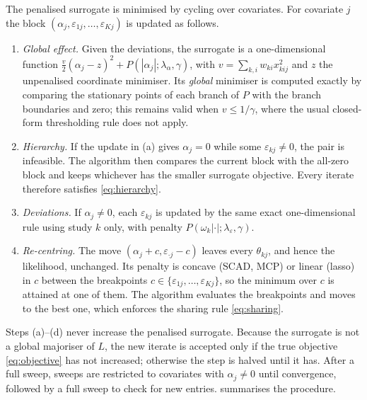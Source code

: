 \documentclass[11pt]{article}
\theoremstyle{remark}
\numberwithin{equation}{section}
\begin{document}
The penalised surrogate is minimised by cycling over covariates. For covariate
$j$ the block $(\alpha_j,\varepsilon_{1j},\dots,\varepsilon_{Kj})$ is updated as
follows.
\begin{enumerate}[label=(\alph*), leftmargin=1.4em]
  \item \emph{Global effect.} Given the deviations, the surrogate is a
    one-dimensional function $\tfrac{v}{2}(\alpha_j-z)^2+P(|\alpha_j|;\lambda_\alpha,\gamma)$,
    with $v=\sum_{k,i}w_{ki}x_{kij}^2$ and $z$ the unpenalised coordinate
    minimiser. Its \emph{global} minimiser is computed exactly by comparing the
    stationary points of each branch of $P$ with the branch boundaries and zero;
    this remains valid when $v\le1/\gamma$, where the usual closed-form
    thresholding rule does not apply.
  \item \emph{Hierarchy.} If the update in (a) gives $\alpha_j=0$ while some
    $\varepsilon_{kj}\ne0$, the pair is infeasible. The algorithm then compares the
    current block with the all-zero block and keeps whichever has the smaller
    surrogate objective. Every iterate therefore satisfies \eqref{eq:hierarchy}.
  \item \emph{Deviations.} If $\alpha_j\neq0$, each $\varepsilon_{kj}$ is updated
    by the same exact one-dimensional rule using study $k$ only, with penalty
    $P(\omega_k|\cdot|;\lambda_\varepsilon,\gamma)$.
  \item \emph{Re-centring.} The move $(\alpha_j+c,\varepsilon_{\cdot j}-c)$ leaves every
    $\theta_{kj}$, and hence the likelihood, unchanged. Its penalty is concave
    (SCAD, MCP) or linear (lasso) in $c$ between the breakpoints
    $c\in\{\varepsilon_{1j},\dots,\varepsilon_{Kj}\}$, so the minimum over $c$ is
    attained at one of them. The algorithm evaluates the breakpoints and moves to
    the best one, which enforces the sharing rule \eqref{eq:sharing}.
\end{enumerate}
Steps (a)--(d) never increase the penalised surrogate. Because the surrogate is
not a global majoriser of $L$, the new iterate is accepted only if the true
objective \eqref{eq:objective} has not increased; otherwise the step is halved
until it has. After a full sweep, sweeps are restricted to covariates with
$\alpha_j\ne0$ until convergence, followed by a full sweep to check for new
entries.  summarises the procedure.
\end{document}
